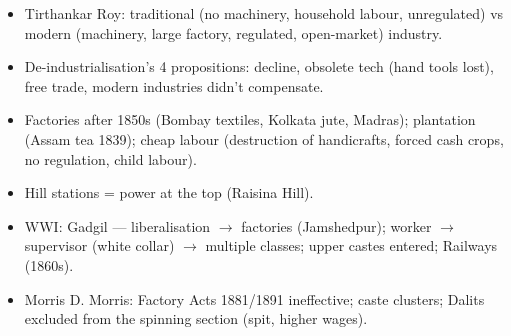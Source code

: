 \begin{QuickRevision}
\begin{itemize}
\item Tirthankar Roy: traditional (no machinery, household labour, unregulated) vs modern (machinery, large factory, regulated, open-market) industry.
\item De-industrialisation's 4 propositions: decline, obsolete tech (hand tools lost), free trade, modern industries didn't compensate.
\item Factories after 1850s (Bombay textiles, Kolkata jute, Madras); plantation (Assam tea 1839); cheap labour (destruction of handicrafts, forced cash crops, no regulation, child labour).
\item Hill stations = power at the top (Raisina Hill).
\item WWI: Gadgil --- liberalisation $\rightarrow$ factories (Jamshedpur); worker $\rightarrow$ supervisor (white collar) $\rightarrow$ multiple classes; upper castes entered; Railways (1860s).
\item Morris D. Morris: Factory Acts 1881/1891 ineffective; caste clusters; Dalits excluded from the spinning section (spit, higher wages).
\end{itemize}
\end{QuickRevision}


